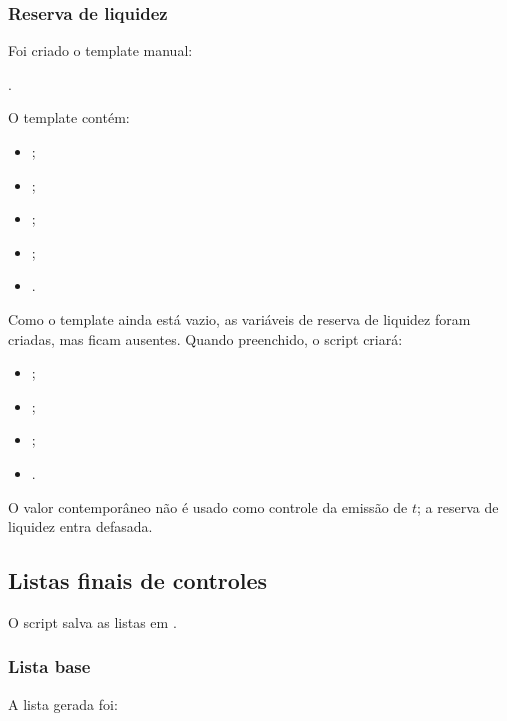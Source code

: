 \documentclass[12pt,a4paper]{article}
\begin{document}
\subsubsection{Reserva de liquidez}

Foi criado o template manual:
\begin{center}
.
\end{center}

O template contém:

\begin{itemize}[leftmargin=1.2cm]
    \item {};
    \item {};
    \item {};
    \item {};
    \item {}.
\end{itemize}

Como o template ainda está vazio, as variáveis de reserva de liquidez foram
criadas, mas ficam ausentes. Quando preenchido, o script criará:

\begin{itemize}[leftmargin=1.2cm]
    \item {};
    \item {};
    \item {};
    \item {}.
\end{itemize}

O valor contemporâneo não é usado como controle da emissão de \(t\); a reserva de
liquidez entra defasada.

\subsection{Listas finais de controles}

O script salva as listas em
.

\subsubsection{Lista base}

A lista  gerada foi:
\end{document}
